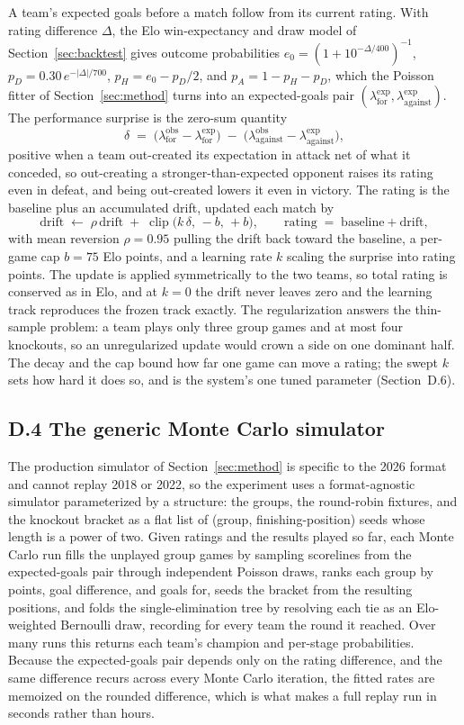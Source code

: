 \documentclass[11pt,letterpaper]{article}
\begin{document}
A team's expected goals before a match follow from its current rating. With rating difference $\Delta$, the Elo win-expectancy and draw model of Section~\ref{sec:backtest} gives outcome probabilities $e_0 = (1+10^{-\Delta/400})^{-1}$, $p_D = 0.30\,e^{-|\Delta|/700}$, $p_H = e_0 - p_D/2$, and $p_A = 1 - p_H - p_D$, which the Poisson fitter of Section~\ref{sec:method} turns into an expected-goals pair $(\lambda^{\text{exp}}_{\text{for}}, \lambda^{\text{exp}}_{\text{against}})$. The performance surprise is the zero-sum quantity
\[
\delta \;=\; \big(\lambda^{\text{obs}}_{\text{for}} - \lambda^{\text{exp}}_{\text{for}}\big) \;-\; \big(\lambda^{\text{obs}}_{\text{against}} - \lambda^{\text{exp}}_{\text{against}}\big),
\]
positive when a team out-created its expectation in attack net of what it conceded, so out-creating a stronger-than-expected opponent raises its rating even in defeat, and being out-created lowers it even in victory. The rating is the baseline plus an accumulated drift, updated each match by
\[
\text{drift} \;\leftarrow\; \rho\,\text{drift} \;+\; \operatorname{clip}\!\big(k\,\delta,\, -b,\, +b\big), \qquad \text{rating} \;=\; \text{baseline} + \text{drift},
\]
with mean reversion $\rho = 0.95$ pulling the drift back toward the baseline, a per-game cap $b = 75$ Elo points, and a learning rate $k$ scaling the surprise into rating points. The update is applied symmetrically to the two teams, so total rating is conserved as in Elo, and at $k=0$ the drift never leaves zero and the learning track reproduces the frozen track exactly. The regularization answers the thin-sample problem: a team plays only three group games and at most four knockouts, so an unregularized update would crown a side on one dominant half. The decay and the cap bound how far one game can move a rating; the swept $k$ sets how hard it does so, and is the system's one tuned parameter (Section~D.6).

\subsection*{D.4 \quad The generic Monte Carlo simulator}

The production simulator of Section~\ref{sec:method} is specific to the 2026 format and cannot replay 2018 or 2022, so the experiment uses a format-agnostic simulator parameterized by a structure: the groups, the round-robin fixtures, and the knockout bracket as a flat list of (group, finishing-position) seeds whose length is a power of two. Given ratings and the results played so far, each Monte Carlo run fills the unplayed group games by sampling scorelines from the expected-goals pair through independent Poisson draws, ranks each group by points, goal difference, and goals for, seeds the bracket from the resulting positions, and folds the single-elimination tree by resolving each tie as an Elo-weighted Bernoulli draw, recording for every team the round it reached. Over many runs this returns each team's champion and per-stage probabilities. Because the expected-goals pair depends only on the rating difference, and the same difference recurs across every Monte Carlo iteration, the fitted rates are memoized on the rounded difference, which is what makes a full replay run in seconds rather than hours.
\end{document}
